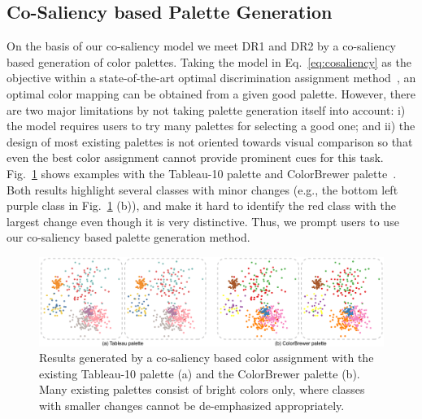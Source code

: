 \subsection{Co-Saliency based Palette Generation}
\label{subsec:solver}
On the basis of our co-saliency model we meet DR1 and DR2 by a co-saliency based generation of color palettes. %
Taking the model in Eq.~\ref{eq:cosaliency} as the objective within a state-of-the-art optimal discrimination assignment method~\cite{Wang2018}, an optimal color mapping can be obtained from a given  good palette. However, there are two major limitations by not taking palette generation itself into account: i) the model requires users to try many palettes for selecting a good one; and ii) the design of most existing palettes is not oriented towards visual comparison so that even the best color assignment cannot provide prominent cues for this task.
Fig.~\ref{fig:colorbrewer} shows examples with the Tableau-10 palette and ColorBrewer palette~\cite{harrower2003colorbrewer}. Both results highlight several classes with minor changes (e.g., the bottom left purple class in Fig.~\ref{fig:colorbrewer} (b)), and make it hard to identify the red class with the largest change  even though it is very distinctive. Thus, we prompt users to use our co-saliency based palette generation method.


\begin{figure}[!tb]
\centering
\includegraphics[width=1\columnwidth]{figures/colorbrewer.pdf}
\caption{Results generated by a co-saliency based color assignment with the existing
Tableau-10 palette (a) and the ColorBrewer palette (b). Many existing palettes consist of   bright colors only, where classes with smaller changes cannot be de-emphasized appropriately.}
\vspace*{-3mm}
\label{fig:colorbrewer}
\end{figure}

